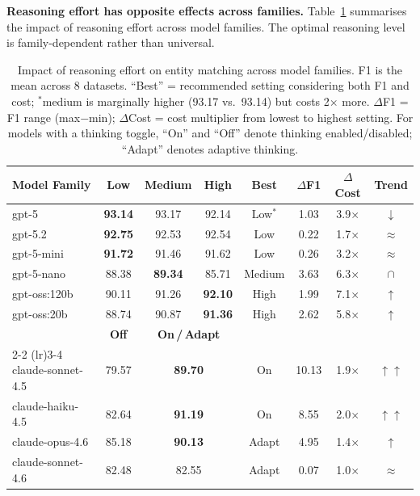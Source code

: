 \textbf{Reasoning effort has opposite effects across families.}  Table~\ref{tab:em_reasoning} summarises the impact of reasoning effort across model families.  The optimal reasoning level is family-dependent rather than universal.

\begin{table}[htbp]
\centering
\caption{Impact of reasoning effort on entity matching across model families.  F1 is the mean across 8 datasets.  ``Best'' = recommended setting considering both F1 and cost; $^\ast$medium is marginally higher (93.17 vs.\ 93.14) but costs 2$\times$ more.  $\Delta$F1 = F1 range (max$-$min); $\Delta$Cost = cost multiplier from lowest to highest setting.  For models with a thinking toggle, ``On'' and ``Off'' denote thinking enabled/disabled; ``Adapt'' denotes adaptive thinking.}
\label{tab:em_reasoning}
\small
\setlength{\tabcolsep}{3pt}
\begin{tabular}{lccccccc}
\toprule
\textbf{Model Family} & \textbf{Low} & \textbf{Medium} & \textbf{High} & \textbf{Best} & \textbf{$\Delta$F1} & \textbf{$\Delta$Cost} & \textbf{Trend} \\
\midrule
gpt-5        & \textbf{93.14} & 93.17 & 92.14 & Low$^\ast$  & 1.03 & 3.9$\times$ & $\downarrow$ \\
gpt-5.2      & \textbf{92.75} & 92.53 & 92.54 & Low  & 0.22 & 1.7$\times$ & $\approx$ \\
gpt-5-mini   & \textbf{91.72} & 91.46 & 91.62 & Low  & 0.26 & 3.2$\times$ & $\approx$ \\
gpt-5-nano   & 88.38 & \textbf{89.34} & 85.71 & Medium  & 3.63 & 6.3$\times$ & $\cap$ \\
gpt-oss:120b & 90.11 & 91.26 & \textbf{92.10} & High & 1.99 & 7.1$\times$ & $\uparrow$ \\
gpt-oss:20b  & 88.74 & 90.87 & \textbf{91.36} & High & 2.62 & 5.8$\times$ & $\uparrow$ \\
\midrule
 & \textbf{Off} & \multicolumn{2}{c}{\textbf{On\,/\,Adapt}} & & & & \\
\cmidrule(lr){2-2} \cmidrule(lr){3-4}
claude-sonnet-4.5 & 79.57 & \multicolumn{2}{c}{\textbf{89.70}} & On & 10.13 & 1.9$\times$ & $\uparrow\uparrow$ \\
claude-haiku-4.5  & 82.64 & \multicolumn{2}{c}{\textbf{91.19}} & On & 8.55 & 2.0$\times$ & $\uparrow\uparrow$ \\
claude-opus-4.6   & 85.18 & \multicolumn{2}{c}{\textbf{90.13}} & Adapt & 4.95 & 1.4$\times$ & $\uparrow$ \\
claude-sonnet-4.6 & 82.48 & \multicolumn{2}{c}{82.55} & Adapt & 0.07 & 1.0$\times$ & $\approx$ \\

\end{tabular}
\end{table}
